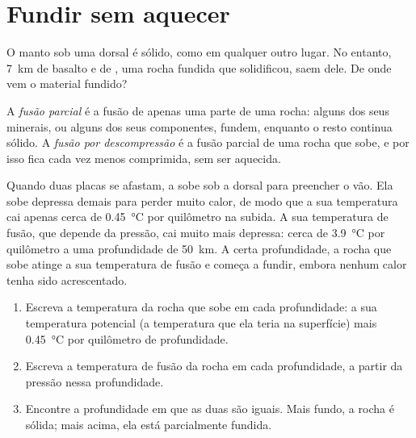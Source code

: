 \section{Fundir sem aquecer}

O manto sob uma dorsal é  sólido, como em qualquer outro lugar. No
entanto, \qty{7}{km} de basalto e de , uma rocha fundida que
solidificou, saem dele. De onde vem o material fundido?

\begin{definition}\label{def:g11:ocean-ridges:partial-melting}
A \emph{fusão parcial} é a fusão de apenas
uma parte de uma rocha: alguns dos seus minerais, ou alguns dos seus
componentes, fundem, enquanto o resto continua sólido.
A \emph{fusão por descompressão} é a fusão parcial de uma rocha que sobe, e por isso fica cada vez
menos comprimida, sem ser aquecida.
\end{definition}

Quando duas placas se afastam, a  sobe sob a dorsal para
preencher o vão. Ela sobe depressa demais para perder muito calor, de modo
que a sua temperatura cai apenas cerca de \qty{0.45}{\celsius} por
quilômetro na subida. A sua temperatura de fusão, que depende da pressão,
cai muito mais depressa: cerca de \qty{3.9}{\celsius} por quilômetro a uma
profundidade de \qty{50}{km}. A certa profundidade, a rocha que sobe atinge
a sua temperatura de fusão e começa a fundir, embora nenhum calor tenha sido
acrescentado.

\begin{method}\label{met:g11:ocean-ridges:melting}
\begin{enumerate}
  \item Escreva a temperatura da rocha que sobe em cada profundidade: a sua
        temperatura potencial (a temperatura que ela teria na superfície)
        mais \qty{0.45}{\celsius} por quilômetro de profundidade.
  \item Escreva a temperatura de fusão da rocha em cada profundidade, a
        partir da pressão nessa profundidade.
  \item Encontre a profundidade em que as duas são iguais. Mais fundo, a
        rocha é sólida; mais acima, ela está parcialmente fundida.
\end{enumerate}
\end{method}

